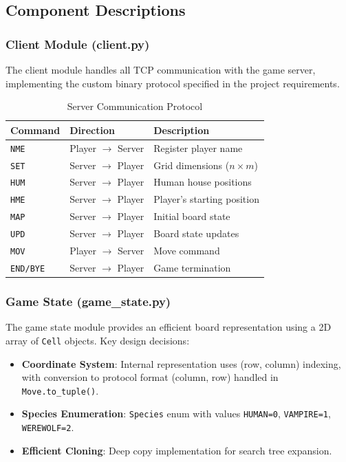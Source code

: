 \documentclass[11pt,a4paper]{article}
\begin{document}
\subsection{Component Descriptions}

\subsubsection{Client Module (client.py)}

The client module handles all TCP communication with the game server, implementing the custom binary protocol specified in the project requirements.

\begin{table}[H]
\centering
\caption{Server Communication Protocol}
\label{tab:protocol}
\begin{tabular}{@{}lll@{}}
\toprule
\textbf{Command} & \textbf{Direction} & \textbf{Description} \\
\midrule
\texttt{NME} & Player $\to$ Server & Register player name \\
\texttt{SET} & Server $\to$ Player & Grid dimensions ($n \times m$) \\
\texttt{HUM} & Server $\to$ Player & Human house positions \\
\texttt{HME} & Server $\to$ Player & Player's starting position \\
\texttt{MAP} & Server $\to$ Player & Initial board state \\
\texttt{UPD} & Server $\to$ Player & Board state updates \\
\texttt{MOV} & Player $\to$ Server & Move command \\
\texttt{END/BYE} & Server $\to$ Player & Game termination \\
\bottomrule
\end{tabular}
\end{table}

\subsubsection{Game State (game\_state.py)}

The game state module provides an efficient board representation using a 2D array of \texttt{Cell} objects. Key design decisions:

\begin{itemize}
    \item \textbf{Coordinate System}: Internal representation uses (row, column) indexing, with conversion to protocol format (column, row) handled in \texttt{Move.to\_tuple()}.
    \item \textbf{Species Enumeration}: \texttt{Species} enum with values \texttt{HUMAN=0}, \texttt{VAMPIRE=1}, \texttt{WEREWOLF=2}.
    \item \textbf{Efficient Cloning}: Deep copy implementation for search tree expansion.
\end{itemize}
\end{document}
